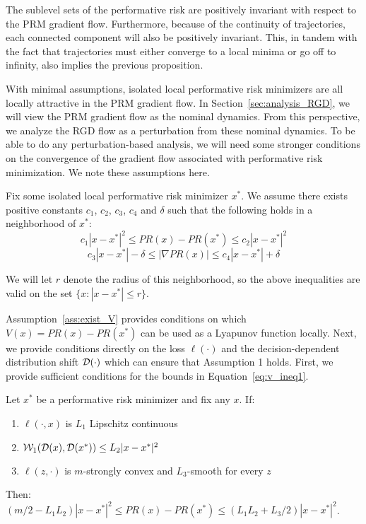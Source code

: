 The sublevel sets of the performative risk are positively invariant with respect to the PRM gradient flow. Furthermore, because of the continuity of trajectories, each connected component will also be positively invariant. This, in tandem with the fact that trajectories must either converge to a local minima or go off to infinity, also implies the previous proposition.

With minimal assumptions, isolated local performative risk minimizers are all locally attractive in the PRM gradient flow. In Section~\ref{sec:analysis_RGD}, we will view the PRM gradient flow as the nominal dynamics. From this perspective, we analyze the RGD flow as a perturbation from these nominal dynamics. To be able to do any perturbation-based analysis, we will need some stronger conditions on the convergence of the gradient flow associated with performative risk minimization. We note these assumptions here.

\begin{assumption}
\label{ass:exist_V}

Fix some isolated local performative risk minimizer $x^*$. 
We assume there exists positive constants $c_1$, $c_2$, $c_3$, $c_4$ and $\delta$ such that the following holds in a neighborhood of $x^*$:
\begin{equation}
\label{eq:v_ineq1}
c_1 |x-x^*|^2 \le PR(x) - PR(x^*) \le c_2 |x-x^*|^2
\end{equation}
\begin{equation}
\label{eq:v_ineq2}
c_3 |x - x^*| - \delta \le | \nabla PR(x) | \le c_4 |x - x^*| + \delta
\end{equation}

We will let $r$ denote the radius of this neighborhood, so the above inequalities are valid on the set $\{ x : |x - x^*| \le r \}$.

\end{assumption}
Assumption~\ref{ass:exist_V} provides conditions on which $V(x) = PR(x) - PR(x^*)$ can be used as a Lyapunov function locally. Next, we provide conditions directly on the loss $\ell(\cdot)$ and the decision-dependent distribution shift $\mathcal{D}(\cdot)$ which can ensure that Assumption 1 holds. First, we provide sufficient conditions for the bounds in Equation~\eqref{eq:v_ineq1}.

\begin{proposition}
\label{prop:pr_bnds}
Let $x^*$ be a performative risk minimizer and fix any $x$. If:
\begin{enumerate}
    \item $\ell(\cdot,x)$ is $L_1$ Lipschitz continuous
    \item $\mathcal{W}_1(\mathcal{D}(x),\mathcal{D}(x^*)) \le L_2 |x-x^*|^2$
    \item $\ell(z,\cdot)$ is $m$-strongly convex and $L_3$-smooth for every $z$
\end{enumerate}
Then: $(m/2 - L_1 L_2) |x-x^*|^2 \le PR(x) - PR(x^*) \le (L_1 L_2 + L_3/2) |x-x^*|^2$.
\end{proposition}

